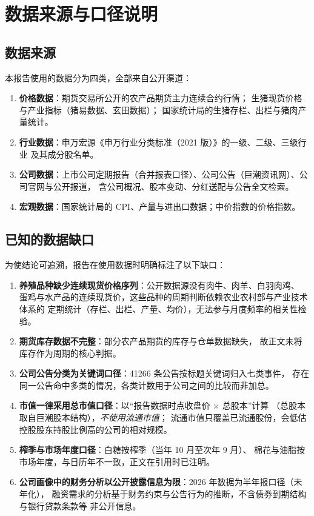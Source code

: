 \section{数据来源与口径说明}
\label{app:sources}

\subsection{数据来源}

本报告使用的数据分为四类，全部来自公开渠道：

\begin{enumerate}[leftmargin=1.5em, itemsep=2pt]
  \item \textbf{价格数据}：期货交易所公开的农产品期货主力连续合约行情；
        生猪现货价格与产业指标（猪易数据、玄田数据）；
        国家统计局的生猪存栏、出栏与猪肉产量统计。
  \item \textbf{行业数据}：申万宏源《申万行业分类标准（2021 版）》的一级、二级、三级行业
        及其成分股名单。
  \item \textbf{公司数据}：上市公司定期报告（合并报表口径）、公司公告（巨潮资讯网）、公司官网与公开报道，
        含公司概况、股本变动、分红送配与公告全文检索。
  \item \textbf{宏观数据}：国家统计局的 CPI、产量与进出口数据；中价指数的价格指数。
\end{enumerate}

\subsection{已知的数据缺口}

为使结论可追溯，报告在使用数据时明确标注了以下缺口：

\begin{enumerate}[leftmargin=1.5em, itemsep=2pt]
  \item \textbf{养殖品种缺少连续现货价格序列}：公开数据源没有肉牛、肉羊、白羽肉鸡、
        蛋鸡与水产品的连续现货价，这些品种的周期判断依赖农业农村部与产业技术体系的
        定期统计（存栏、出栏、产量、均价），无法参与月度频率的相关性检验。
  \item \textbf{期货库存数据不完整}：部分农产品期货的库存与仓单数据缺失，
        故正文未将库存作为周期的核心判据。
  \item \textbf{公司公告分类为关键词口径}：\num{41266} 条公告按标题关键词归入七类事件，
        存在同一公告命中多类的情况，各类计数用于公司之间的比较而非加总。
  \item \textbf{市值一律采用总市值口径}：以“报告数据时点收盘价 $\times$ 总股本”计算
        （总股本取自巨潮股本结构），\emph{不使用流通市值}；
        流通市值只覆盖已流通股份，会低估控股股东持股比例高的公司的相对规模。
  \item \textbf{榨季与市场年度口径}：白糖按榨季（当年 10 月至次年 9 月）、
        棉花与油脂按市场年度，与日历年不一致，正文在引用时已注明。
  \item \textbf{公司画像中的财务分析以公开披露信息为限}：2026 年数据为半年报口径（未年化），
        融资需求的分析基于财务约束与公告行为的推断，不含债券到期结构与银行贷款条款等
        非公开信息。
\end{enumerate}

